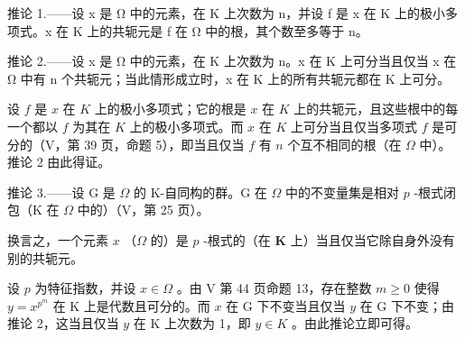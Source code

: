 推论 1.——设 x 是 Ω 中的元素，在 K 上次数为 n，并设 f 是 x 在 K 上的极小多项式。x 在 K 上的共轭元是 f 在 Ω 中的根，其个数至多等于 n。

推论 2.——设 x 是 Ω 中的元素，在 K 上次数为 n。x 在 K 上可分当且仅当 x 在 Ω 中有 n 个共轭元；当此情形成立时，x 在 K 上的所有共轭元都在 K 上可分。

设 \(f\) 是 \(x\) 在 \(K\) 上的极小多项式；它的根是 \(x\) 在 \(K\) 上的共轭元，且这些根中的每一个都以 \(f\) 为其在 \(K\) 上的极小多项式。而 \(x\) 在 \(K\) 上可分当且仅当多项式 \(f\) 是可分的（V，第 39 页，命题 5），即当且仅当 \(f\) 有 \(n\) 个互不相同的根（在 \(\Omega\) 中）。推论 2 由此得证。

推论 3.——设 G 是 \(\Omega\) 的 K-自同构的群。G 在 \(\Omega\) 中的不变量集是相对 \(p\) -根式闭包（K 在 \(\Omega\) 中的）（V，第 25 页）。

换言之，一个元素 \(x\) （\(\Omega\) 的）是 \(p\) -根式的（在 \(\mathbf{K}\) 上）当且仅当它除自身外没有别的共轭元。

设 \(p\) 为特征指数，并设 \(x \in \Omega\) 。由 V 第 44 页命题 13，存在整数 \(m \geqslant 0\) 使得 \(y = x^{p^m}\) 在 K 上是代数且可分的。而 \(x\) 在 G 下不变当且仅当 \(y\) 在 G 下不变；由推论 2，这当且仅当 \(y\) 在 K 上次数为 1，即 \(y \in K\) 。由此推论立即可得。

